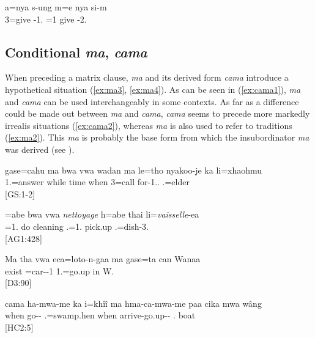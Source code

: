 \ea \label{ex:ma1}
\gll a=nya s-ung m=e nya si-m\\
 3=give -1.	=1	give -2.\\
\glt {}
\z

\subsection{Conditional \textit{ma}, \textit{cama} }
\label{ssec:cond_ma}

When preceding a matrix clause, \textit{ma} and its derived form \textit{cama} introduce a hypothetical situation (\ref{ex:ma3}, \ref{ex:ma4}). As can be seen in (\ref{ex:cama1}), \textit{ma} and \textit{cama} can be used interchangeably in some contexts. As far as a difference could be made out between \textit{ma} and \textit{cama}, \textit{cama} seems to precede more markedly irrealis situations (\ref{ex:cama2}), whereas \textit{ma} is also used to refer to traditions (\ref{ex:ma2}). This \textit{ma} is probably the base form from which the insubordinator \textit{ma} was derived (see ).


\ea\label{ex:ma3}\gll gase=cahu ma bwa vwa wadan {ma} le=tho nyakoo-je ka li=xhaohmu\\
 1.=answer while   time when 3=call for-1..  .=elder\\
\glt {} {[GS:1-2]}
\z

\ea\label{ex:ma2}=abe bwa vwa \textit{nettoyage} h=abe thai li=\textit{vaisselle}-ea\\
 =1.  do cleaning .=1. pick.up .=dish-3.\\
\glt {} {[AG1:428]}
\z

\ea\label{ex:ma4}\gll Ma tha vwa eca=loto-n-gaa ma gase=ta can Wanaa\\
   exist =car--1  1.=go.up in W.\\
\glt {} {[D3:90]}
\z

\ea\label{ex:cama1}\gll cama	ha-mwa-me	ka	i=khîî	ma	hma-ca-mwa-me	paa	cika	mwa	wâng\\
 when	go--	 .=swamp.hen	when arrive-go.up-- 	.	 boat\\
\glt {} {[HC2:5]}
\z 

